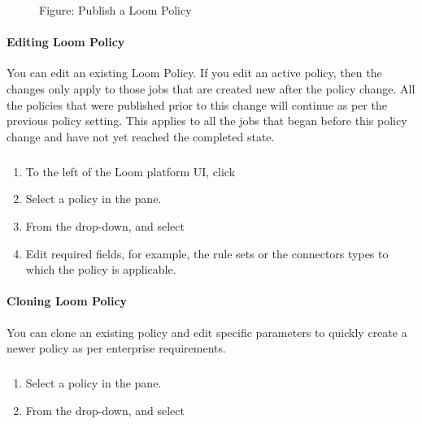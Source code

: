 \documentclass[letterpaper,10pt,english]{sphinxmanual}
\begin{document}
\begin{figure}[htbp]
\centering
\capstart

\noindent{}
\caption{Figure: Publish a Loom Policy}\label{\detokenize{loom_getting_started_guide:id45}}\end{figure}


\paragraph{Editing Loom Policy}
\label{\detokenize{loom_getting_started_guide:editing-loom-policy}}
You can edit an existing Loom Policy. If you edit an active policy, then the changes only apply to those jobs that are created new after the policy change. All the policies that were published prior to this change will continue as per the previous policy setting.  This applies to all the jobs that began before this policy change and have not yet reached the completed state.


\subparagraph{}
\label{\detokenize{loom_getting_started_guide:to-edit-a-policy}}\begin{enumerate}
\item {} 
To the left of the Loom platform UI, click 

\item {} 
Select a policy in the  pane.

\item {} 
From the  drop-down, and select 

\item {} 
Edit required fields, for example, the rule sets or the connectors types to which the policy is applicable.

\end{enumerate}


\paragraph{Cloning Loom Policy}
\label{\detokenize{loom_getting_started_guide:cloning-loom-policy}}
You can clone an existing policy and edit specific parameters to quickly create a newer policy as per enterprise requirements.


\subparagraph{}
\label{\detokenize{loom_getting_started_guide:to-clone-a-policy}}\begin{enumerate}
\item {} 
Select a policy in the  pane.

\item {} 
From the  drop-down, and select 

\end{enumerate}
\end{document}
